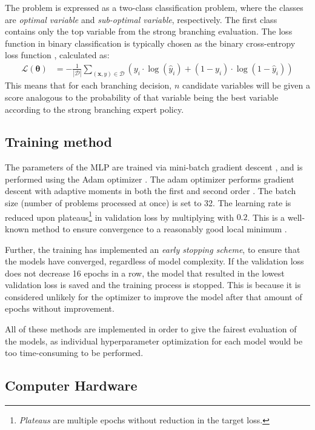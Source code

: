 The problem is expressed as a two-class classification problem, where the classes are \textit{optimal variable} and \textit{sub-optimal variable}, respectively. The first class contains only the top variable from the strong branching evaluation. The loss function in binary classification is typically chosen as the binary cross-entropy loss function \cite{goodfellow2016deep}, calculated as:
\begin{align}
    \bm{\mathcal{L}}(\bm{\theta}) &= - \frac{1}{|\mathcal{D}|}\sum_{(\bm{x}, y) \in \mathcal{D}} \left( y_i \cdot \log( \hat y_i) + (1-y_i) \cdot \log(1 - \hat y_i) \right)
\end{align}
This means that for each branching decision, $n$ candidate variables will be given a score analogous to the probability of that variable being the best variable according to the strong branching expert policy. 

\subsection{Training method}

The parameters of the \gls{MLP} are trained via mini-batch gradient descent \cite{goodfellow2016deep}, and is performed using 
 the Adam optimizer \cite{kingma2017adam}. The adam optimizer performs gradient descent with adaptive moments in both the first and second order \cite{kingma2017adam}. 
 The batch size (number of problems processed at once) is set to 32. The learning rate is reduced upon plateaus\footnote{\textit{Plateaus} are multiple epochs without reduction in the target loss.} in validation loss 
 by multiplying with $ 0.2 $. This is a well-known method to ensure convergence to a reasonably good local minimum \cite{goodfellow2016deep}.
 
 Further, the training has implemented an \textit{early stopping scheme}, to ensure that the models have converged, regardless of model complexity. If the validation loss does not decrease 16 epochs in a row, the model that resulted in the lowest validation loss is saved and the training process is stopped. This is because it is considered unlikely for the optimizer to improve the model after that amount of epochs without improvement. 
 
 All of these methods are implemented in order to give the fairest evaluation of the models, as individual hyperparameter optimization for each model would be too time-consuming to be performed. 


\subsection{Computer Hardware}

